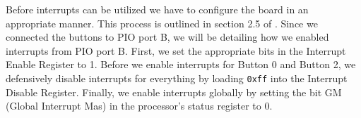 Before interrupts can be utilized we have to configure the board in an appropriate manner.
This process is outlined in section 2.5 of \cite{lab-compendium}.
Since we connected the buttons to PIO port B, we will be detailing how we enabled interrupts from PIO port B.
First, we set the appropriate bits in the Interrupt Enable Register to 1.
Before we enable interrupts for Button 0 and Button 2, we defensively disable interrupts for everything by loading \texttt{0xff} into the Interrupt Disable Register.
Finally, we enable interrupts globally by setting the bit GM (Global Interrupt Mas) in the processor's status register to 0. %
